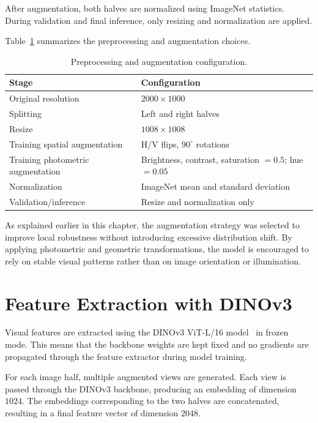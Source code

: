 After augmentation, both halves are normalized using ImageNet statistics. During validation and final inference, only resizing and normalization are applied.

Table~\ref{tab:preprocessing} summarizes the preprocessing and augmentation choices.

\begin{table}[htbp]
\centering
\caption{Preprocessing and augmentation configuration.}
\label{tab:preprocessing}
\begin{tabular}{ll}
\hline
\textbf{Stage} & \textbf{Configuration} \\
\hline
Original resolution & $2000 \times 1000$ \\
Splitting & Left and right halves \\
Resize & $1008 \times 1008$ \\
Training spatial augmentation & H/V flips, $90^\circ$ rotations \\
Training photometric augmentation & Brightness, contrast, saturation $=0.5$; hue $=0.05$ \\
Normalization & ImageNet mean and standard deviation \\
Validation/inference & Resize and normalization only \\
\hline
\end{tabular}
\end{table}

As explained earlier in this chapter, the augmentation strategy was selected to improve local robustness without introducing excessive distribution shift. By applying photometric and geometric transformations, the model is encouraged to rely on stable visual patterns rather than on image orientation or illumination.

\section{Feature Extraction with DINOv3}

Visual features are extracted using the DINOv3 ViT-L/16 model~\cite{simeoni2025dinov3} in frozen mode. This means that the backbone weights are kept fixed and no gradients are propagated through the feature extractor during model training.

For each image half, multiple augmented views are generated. Each view is passed through the DINOv3 backbone, producing an embedding of dimension $1024$. The embeddings corresponding to the two halves are concatenated, resulting in a final feature vector of dimension $2048$.

